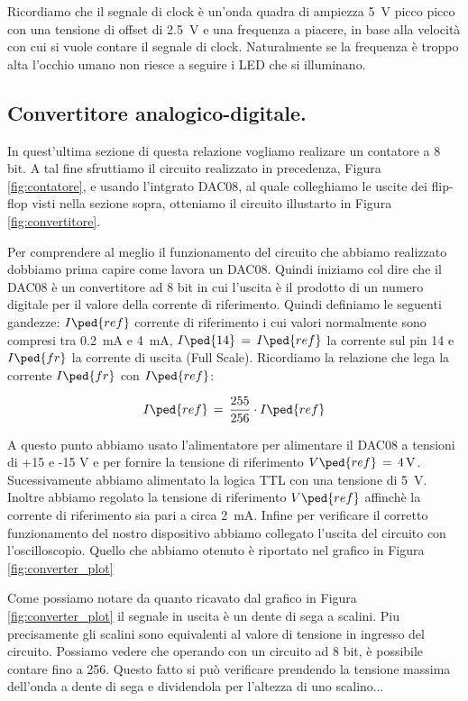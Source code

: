 Ricordiamo che il segnale di clock è un'onda quadra di ampiezza \SI{5}{\volt} picco picco con una tensione di offset di \SI{+2.5}{\volt} e una frequenza a piacere, in base alla velocità con cui si vuole contare il segnale di clock. Naturalmente se la frequenza è troppo alta l'occhio umano non riesce a seguire i LED che si illuminano.

\subsection*{Convertitore analogico-digitale.}

In quest'ultima sezione di questa relazione vogliamo realizare un contatore a 8 bit. A tal fine sfruttiamo il circuito realizzato in precedenza, Figura \ref{fig:contatore}, e usando l'intgrato DAC08, al quale colleghiamo le uscite dei flip-flop visti nella sezione sopra, otteniamo il circuito illustarto in Figura \ref{fig:convertitore}.

Per comprendere al meglio il funzionamento del circuito che abbiamo realizzato dobbiamo prima capire come lavora un DAC08. Quindi iniziamo col dire che il DAC08 è un convertitore ad 8 bit in cui l'uscita è il prodotto di un numero digitale per il valore della corrente di riferimento.
Quindi definiamo le seguenti gandezze: $I\ped{ref}$ corrente di riferimento i cui valori normalmente sono compresi tra \SI{0.2}{\milli\ampere} e \SI{4}{\milli\ampere}, $I\ped{14}\,=\,I\ped{ref}$ la corrente sul pin 14 e $I\ped{fr}$ la corrente di uscita (Full Scale).
Ricordiamo la relazione che lega la corrente $I\ped{fr}$ con $I\ped{ref}$:

\begin{equation}
	I\ped{ref}\,=\,\frac{255}{256} \cdot I\ped{ref}
	\label{eq:corrente}
\end{equation}

A questo punto abbiamo usato l'alimentatore per alimentare il DAC08 a tensioni di +15 e -15 \si{\volt} e per fornire la tensione di riferimento $V\ped{ref}\,=\,\SI{+4}{\volt}$. Sucessivamente abbiamo alimentato la logica TTL con una tensione di \SI{+5}{\volt}. Inoltre abbiamo regolato la tensione di riferimento $V\ped{ref}$ affinchè la corrente di riferimento sia pari a circa \SI{2}{\milli\ampere}.
Infine per verificare il corretto funzionamento del nostro dispositivo abbiamo collegato l'uscita del circuito con l'oscilloscopio.
Quello che abbiamo otenuto è riportato nel grafico in Figura \ref{fig:converter_plot}

Come possiamo notare da quanto ricavato dal grafico in Figura \ref{fig:converter_plot} il segnale in uscita è un dente di sega a scalini. Piu precisamente gli scalini sono equivalenti al valore di tensione in ingresso del circuito. Possiamo vedere che operando con un circuito ad 8 bit, è possibile contare fino a 256. Questo fatto si può verificare prendendo la tensione massima dell'onda a dente di sega e dividendola per l'altezza di uno scalino...



